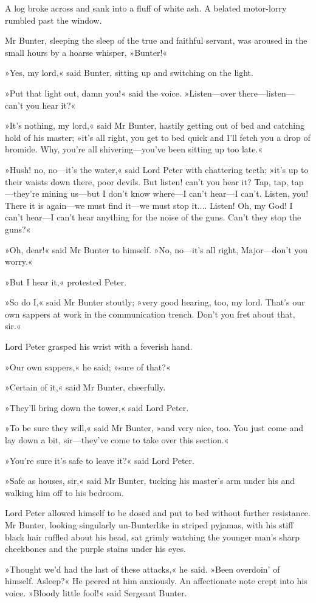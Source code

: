 A log broke across and sank into a fluff of white ash. A belated motor-lorry rumbled past the window.

Mr Bunter, sleeping the sleep of the true and faithful servant, was aroused in the small hours by a hoarse whisper, »Bunter!«

»Yes, my lord,« said Bunter, sitting up and switching on the light.

»Put that light out, damn you!« said the voice. »Listen\allowbreak---\allowbreak over there\allowbreak---\allowbreak listen---can't you hear it?«

»It's nothing, my lord,« said Mr Bunter, hastily getting out of bed and catching hold of his master; »it's all right, you get to bed quick and I'll fetch you a drop of bromide. Why, you're all shivering\allowbreak---\allowbreak you've been sitting up too late.«

»Hush! no, no\allowbreak---\allowbreak it's the water,« said Lord Peter with chattering teeth; »it's up to their waists down there, poor devils. But listen! can't you hear it? Tap, tap, tap\allowbreak---\allowbreak they're mining us\allowbreak---\allowbreak but I don't know where\allowbreak---\allowbreak I can't hear\allowbreak---\allowbreak I can't. Listen, you! There it is again\allowbreak---\allowbreak we must find it\allowbreak---\allowbreak we must stop it.... Listen! Oh, my God! I can't hear\allowbreak---\allowbreak I can't hear anything for the noise of the guns. Can't they stop the guns?«

»Oh, dear!« said Mr Bunter to himself. »No, no\allowbreak---\allowbreak it's all right, Major\allowbreak---\allowbreak don't you worry.«

»But I hear it,« protested Peter.

»So do I,« said Mr Bunter stoutly; »very good hearing, too, my lord. That's our own sappers at work in the communication trench. Don't you fret about that, sir.«

Lord Peter grasped his wrist with a feverish hand.

»Our own sappers,« he said; »sure of that?«

»Certain of it,« said Mr Bunter, cheerfully.

»They'll bring down the tower,« said Lord Peter.

»To be sure they will,« said Mr Bunter, »and very nice, too. You just come and lay down a bit, sir\allowbreak---\allowbreak they've come to take over this section.«

»You're sure it's safe to leave it?« said Lord Peter.

»Safe as houses, sir,« said Mr Bunter, tucking his master's arm under his and walking him off to his bedroom.

Lord Peter allowed himself to be dosed and put to bed without further resistance. Mr Bunter, looking singularly un-Bunterlike in striped pyjamas, with his stiff black hair ruffled about his head, sat grimly watching the younger man's sharp cheekbones and the purple stains under his eyes.

»Thought we'd had the last of these attacks,« he said. »Been overdoin' of himself. Asleep?« He peered at him anxiously. An affectionate note crept into his voice. »Bloody little fool!« said Sergeant Bunter.